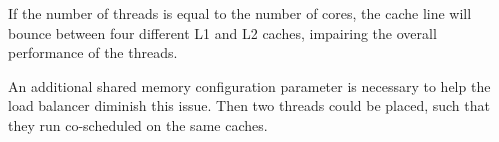 If the number of threads is equal to the number of cores, the cache line will
bounce between four different L1 and L2 caches, impairing the overall
performance of the threads.

An additional shared memory configuration parameter is necessary to help the
load balancer diminish this issue.
Then two threads could be placed, such that they run co-scheduled on the same
caches.



\begin{comment}
\paragraph{Pseudo-code of placement algorithm}
  \begin{verbatim}
  from all threads:
    select #core highest LLC miss rate
    select #core highest exec-time
    intersection of both are critical threads
    if threads placed on different cores
      then do nothing
    else
      move higher LLC miss rate thread to other core
    do accounting

  forall threads left do:
    bin by priority levels
    sort each bin by miss rate

  forall prio-bin in prio-bin-list do:
    while threads in prio-bin
      dequeue highest miss rate
      sort cores by lowest accounted miss rate
      place max(#core, #threads left in bin) threads RR on cores;
  \end{verbatim}

  \paragraph{\gls{smt} abstraction code}
  \begin{verbatim}
  if SMT is enabled
    sort threads once by exec time and once by LLC miss
    while duplication:
      look at next LLC-miss thread and dequeue it from exec-time
      look at next exec-miss thread and dequeue it from LLC-miss

    while threads unassigned && queue not empty:
      dequeue one thread from LLC miss list for SMT#0
      dequeue one thread from LLC-miss list for SMT#1
      dequeue one thread from exe-time list for SMT#0
      dequeue one thread form exec-time list for SMT#1
  \end{verbatim}

  \paragraph{Minimize migration pseudo-code}
  \begin{verbatim}
  sort all threads by LLC-miss
  sliding window size #threads with less than 5% LLC miss difference
  if at least 2 threads in the current window are migrated
    if two threads are swaping cores
      don't do the migration
    ALTERNATIVELY
    if the from-core-to-core-matrix has entries on opposing fields
      swap the to-values of both entries
  \end{verbatim}

\end{comment}
